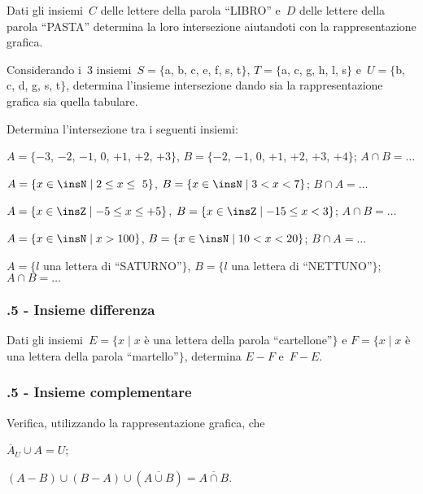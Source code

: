 \begin{esercizio}
 \label{ese:7.11}
Dati gli insiemi~$C$ delle lettere della parola ``LIBRO'' e~$D$ delle lettere della
parola ``PASTA'' determina la loro intersezione aiutandoti con la rappresentazione grafica.
\end{esercizio}

\begin{esercizio}
 \label{ese:7.12}
Considerando i~3 insiemi~$S=\{$a, b, c, e, f, s, t$\}$, $T=\{$a, c, g, h, l, s$\}$ e~$U=\{$b, c, d, g, s, t$\}$,
determina l'insieme intersezione dando sia la rappresentazione grafica sia quella tabulare.
 \end{esercizio}

\begin{esercizio}
 \label{ese:7.13}
 Determina l'intersezione tra i seguenti insiemi:
\begin{enumeratea}
 \item $A=\{-3$, $-2$, $-1$, $0$, $+1$, $+2$, $+3\}$, $B=\{-2$, $-1$, $0$, $+1$, $+2$, $+3$, $+4\}$; $A\cap B=\ldots$
 \item $A=\{x\in\insN\mid 2\le x\le~5\}$, $B=\{x\in\insN\mid 3<x<7\}$; $B\cap A=\ldots$
 \item $A=\{x\in\insZ\mid -5\le x\le+5\}$, $B=\{x\in\insZ\mid -15\le x<3\}$; $A\cap B=\ldots$
 \item $A=\{x\in\insN\mid x>100\}$, $B=\{x\in\insN\mid 10<x<20\}$; $B\cap A=\ldots$
 \item $A=\{l$ una lettera di ``SATURNO''$\}$, $B=\{l$ una lettera di ``NETTUNO''$\}$; $A\cap B=\ldots$
\end{enumeratea}
\end{esercizio}

\subsubsection*{\thechapter.5 - Insieme differenza}
\begin{esercizio}
\label{ese:7.14}
Dati gli insiemi~$E=\{x\mid x$ è una lettera della parola ``cartellone''$\}$ e
$F=\{x\mid x$ è una lettera della parola ``martello''$\}$, determina
$E-F$ e~$F-E$.
\end{esercizio}

\subsubsection*{\thechapter.5 - Insieme complementare}
\begin{esercizio}
\label{ese:7.15}
Verifica, utilizzando la rappresentazione grafica, che
\begin{multicols}{2}
 \begin{enumeratea}
 \item $\overline{A}_{U}\cup A=U$;
 \item $(A-B)\cup (B-A)\cup (\overline{A\cup B})=\overline{A\cap B}$.
 \end{enumeratea}
\end{multicols}
\end{esercizio}

